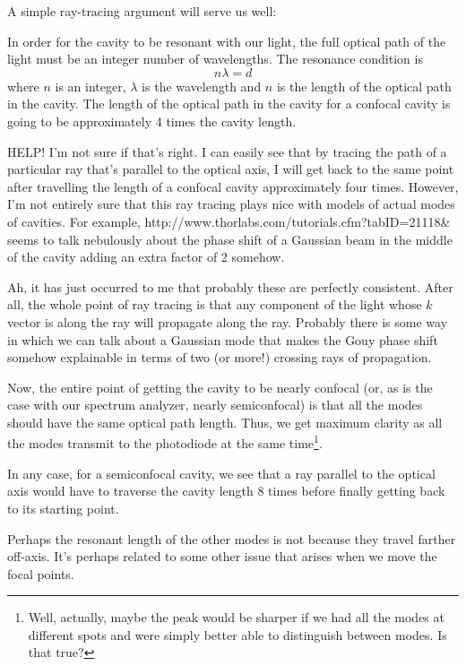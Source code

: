 A simple ray-tracing argument will serve us well:

In order for the cavity to be resonant with our light, the full optical path of the light must be an integer number of wavelengths. The resonance condition is 
\begin{equation}
n \lambda = d
\end{equation}
where $n$ is an integer, $\lambda$ is the wavelength and $n$ is the length of the optical path in the cavity. The length of the optical path in the cavity for a confocal cavity is going to be approximately 4 times the cavity length. 

HELP! I'm not sure if that's right. I can easily see that by tracing the path of a particular ray that's parallel to the optical axis, I will get back to the same point after travelling the length of a confocal cavity approximately four times. However, I'm not entirely sure that this ray tracing plays nice with models of actual modes of cavities.
For example, http://www.thorlabs.com/tutorials.cfm?tabID=21118\& seems to talk nebulously about the phase shift of a Gaussian beam in the middle of the cavity adding an extra factor of 2 somehow. 

Ah, it has just occurred to me that probably these are perfectly consistent. After all, the whole point of ray tracing is that any component of the light whose $k$ vector is along the ray will propagate along the ray. Probably there is some way in which we can talk about a Gaussian mode that makes the Gouy phase shift somehow explainable in terms of two (or more!) crossing rays of propagation. 

Now, the entire point of getting the cavity to be nearly confocal (or, as is the case with our spectrum analyzer, nearly semiconfocal) is that all the modes should have the same optical path length. Thus, we get maximum clarity as all the modes transmit to the photodiode at the same time\footnote{Well, actually, maybe the peak would be sharper if we had all the modes at different spots and were simply better able to distinguish between modes. Is that true?}. 

In any case, for a semiconfocal cavity, we see that a ray parallel to the optical axis would have to traverse the cavity length 8 times before finally getting back to its starting point. 

Perhaps the resonant length of the other modes is not because they travel farther off-axis. It's perhaps related to some other issue that arises when we move the focal points.




